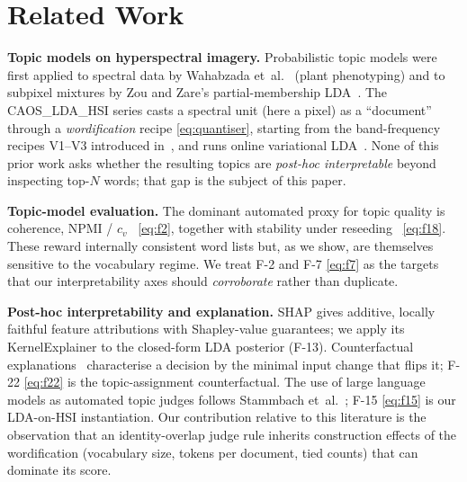 \documentclass[journal,a4paper,10pt]{IEEEtran}
\begin{document}
\section{Related Work}\label{sec:related}

\textbf{Topic models on hyperspectral imagery.} Probabilistic topic
models were first applied to spectral data by Wahabzada
et~al.~\cite{wahabzada2015plant} (plant phenotyping) and to subpixel
mixtures by Zou and Zare's partial-membership LDA~\cite{zou2017pmlda}.
The CAOS\_LDA\_HSI series casts a spectral unit (here a pixel) as a
``document'' through a \emph{wordification} recipe
\eqref{eq:quantiser}, starting from the band-frequency recipes V1--V3
introduced in~\cite{santibanezleal2022procemin}, and runs online
variational LDA~\cite{blei2003lda, hoffman2010online}. None of this
prior work asks whether the resulting topics are \emph{post-hoc
interpretable} beyond inspecting top-$N$ words; that gap is the
subject of this paper.

\textbf{Topic-model evaluation.} The dominant automated proxy for
topic quality is coherence, NPMI / $c_v$~\cite{newman2010coherence,
mimno2011coherence, roder2015exploring} \eqref{eq:f2}, together with
stability under reseeding~\cite{greene2014topics} \eqref{eq:f18}.
These reward internally consistent word lists but, as we show, are
themselves sensitive to the vocabulary regime. We treat F-2 and F-7
\eqref{eq:f7} as the targets that our interpretability axes should
\emph{corroborate} rather than duplicate.

\textbf{Post-hoc interpretability and explanation.} SHAP
\cite{lundberg2017shap} gives additive, locally faithful feature
attributions with Shapley-value guarantees; we apply its
KernelExplainer to the closed-form LDA posterior (F-13). Counterfactual
explanations~\cite{wachter2017counterfactual} characterise a decision
by the minimal input change that flips it; F-22 \eqref{eq:f22} is
the topic-assignment counterfactual. The use of large language models
as automated topic judges follows Stammbach
et~al.~\cite{stammbach2023revisiting}; F-15 \eqref{eq:f15} is our
LDA-on-HSI instantiation. Our contribution relative to this literature
is the observation that an identity-overlap judge rule inherits
construction effects of the wordification (vocabulary size, tokens per
document, tied counts) that can dominate its score.

\end{document}
